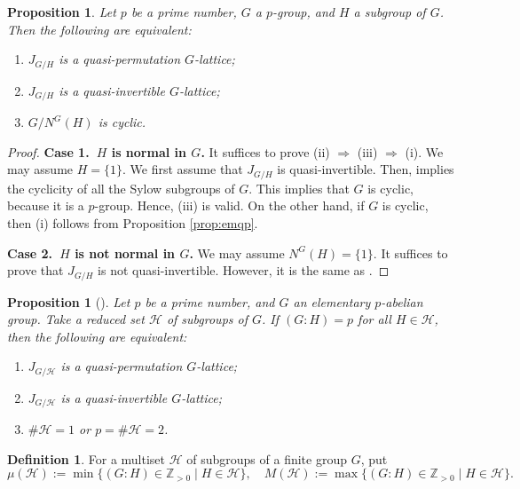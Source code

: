 \documentclass[12pt]{amsart}
\theoremstyle{plain}
\newtheorem{prop}[thm]{Proposition}
\theoremstyle{definition}
\newtheorem{dfn}[thm]{Definition}
\numberwithin{thm}{section}
\numberwithin{equation}{section}
\newcommand{\Zpn}{\mathbb{Z}_{>0}}
\newcommand{\cH}{\mathcal{H}}
\begin{document}
\begin{prop}\label{prop:emn1}
Let $p$ be a prime number, $G$ a $p$-group, and $H$ a subgroup of $G$. Then the following are equivalent: 
\begin{enumerate}
\item $J_{G/H}$ is a quasi-permutation $G$-lattice; 
\item $J_{G/H}$ is a quasi-invertible $G$-lattice; 
\item $G/N^{G}(H)$ is cyclic. 
\end{enumerate}
\end{prop}
\begin{proof}
\textbf{Case 1.~$H$ is normal in $G$. }
It suffices to prove (ii) $\Rightarrow$ (iii) $\Rightarrow$ (i). We may assume $H=\{1\}$. We first assume that $J_{G/H}$ is quasi-invertible. Then, \cite[Theorem 1.5]{Endo1975} implies the cyclicity of all the Sylow subgroups of $G$. This implies that $G$ is cyclic, because it is a $p$-group. Hence, (iii) is valid. On the other hand, if $G$ is cyclic, then (i) follows from Proposition \ref{prop:emqp}. 

\textbf{Case 2.~$H$ is not normal in $G$. }
We may assume $N^{G}(H)=\{1\}$. It suffices to prove that $J_{G/H}$ is not quasi-invertible. However, it is the same as \cite[Theorem 2.1]{Endo2011}. 
\end{proof}

\begin{prop}[{\cite[Theorem 1]{Endo2001}}]\label{prop:endo}
Let $p$ be a prime number, and $G$ an elementary $p$-abelian group. Take a reduced set $\cH$ of subgroups of $G$. If $(G:H)=p$ for all $H\in \cH$, then the following are equivalent: 
\begin{enumerate}
    \item $J_{G/\cH}$ is a quasi-permutation $G$-lattice; 
    \item $J_{G/\cH}$ is a quasi-invertible $G$-lattice; 
    \item $\#\cH=1$ or $p=\#\cH=2$. 
\end{enumerate}
\end{prop}

\begin{dfn}\label{dfn:mudf}
For a multiset $\cH$ of subgroups of a finite group $G$, put
\begin{equation*}
\mu(\cH):=\min\{(G:H)\in \Zpn \mid H\in \cH\},\quad M(\cH):=\max\{(G:H)\in \Zpn \mid H\in \cH\}. 
\end{equation*}
\end{dfn}
\end{document}
